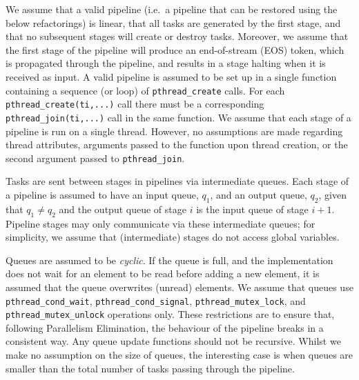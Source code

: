 We assume that a valid pipeline (i.e.\ a pipeline that can be restored using the below refactorings) is linear, that all tasks are generated by the first stage, and that no subsequent stages will create or destroy tasks. Moreover, we assume that the first stage of the pipeline will produce an end-of-stream (EOS) token, which is propagated through the pipeline, and results in a stage halting when it is received as input.
%
A valid pipeline is assumed to be set up in a single function containing a sequence (or loop) of \lstinline|pthread_create| calls. For each \lstinline|pthread_create(ti,...)| call there must be a corresponding \lstinline|pthread_join(ti,...)| call in the same function.
%
%
We assume that each stage of a pipeline is run on a single thread. However, no assumptions are made regarding thread attributes, arguments passed to the function upon thread creation, or the second argument passed to \lstinline|pthread_join|.

Tasks are sent between stages in pipelines via intermediate queues.
%
Each stage of a pipeline is assumed to have an input queue, $q_1$, and an output queue, $q_2$, given that $q_1 \neq q_2$ and the output queue of stage $i$ is the input queue of stage $i+1$.
%
Pipeline stages may only communicate via these intermediate queues; for simplicity, we assume that (intermediate) stages do not access global variables.

Queues are assumed to be \emph{cyclic}. If the queue is full, and the implementation does not wait for an element to be read before adding a new element, it is assumed that the queue overwrites (unread) elements. We assume that queues use \lstinline|pthread_cond_wait|, \lstinline|pthread_cond_signal|, \lstinline|pthread_mutex_lock|, and \lstinline|pthread_mutex_unlock| operations only.
%
These restrictions are to ensure that, following Parallelism Elimination, the behaviour of the pipeline breaks in a consistent way. Any queue update functions should not be recursive.
%
Whilst we make no assumption on the size of queues, the interesting case is when queues are smaller than the total number of tasks passing through the pipeline.

